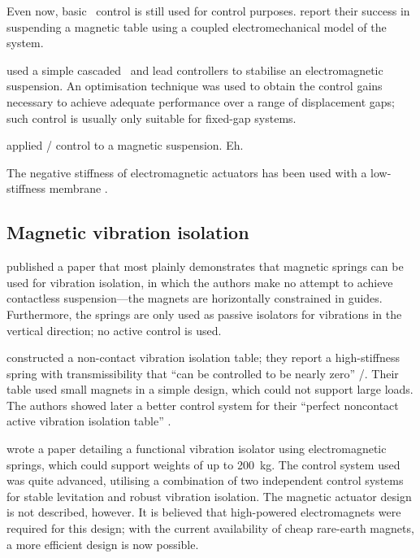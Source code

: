 Even now, basic \PID\ control is still used for control purposes.
\textcite{li2007} report their success in suspending a magnetic table using a coupled electromechanical model of the system.

\textcite{banerjee2008} used a simple cascaded \PI\ and lead controllers to stabilise an electromagnetic suspension.
An optimisation technique was used to obtain the control gains necessary to achieve adequate performance over a range of displacement gaps; such control is usually only suitable for fixed-gap systems.

\textcite{gosiewski2008} applied \Hinf/ control to a magnetic suspension.
Eh.

The negative stiffness of electromagnetic actuators has been used with a low-stiffness membrane \cite{sato2001}.


\subsection{Magnetic vibration isolation}

\textcite{puppin2002} published a paper that most plainly demonstrates that magnetic springs can be used for vibration isolation, in which the authors make no attempt to achieve contactless suspension—the magnets are horizontally constrained in guides.
Furthermore, the springs are only used as passive isolators for vibrations in the vertical direction; no active control is used.


\textcite{nagaya1993} constructed a non-contact vibration isolation table; they report a high-stiffness spring with transmissibility that \enquote{can be controlled to be nearly zero} \sic/.
Their table used small magnets in a simple design, which could not support large loads.
The authors showed later a better control system for their \enquote{perfect noncontact active vibration isolation table} \cite{nagaya1995a}.

\textcite{watanabe1996} wrote a paper detailing a functional vibration isolator using electromagnetic springs, which could support weights of up to
\SI{200}{kg}.
The control system used was quite advanced, utilising a combination of two independent control systems for stable levitation and robust vibration isolation.
The magnetic actuator design is not described, however.
It is believed that high-powered electromagnets were required for this design; with the current availability of cheap rare-earth magnets, a more efficient design is now possible.



